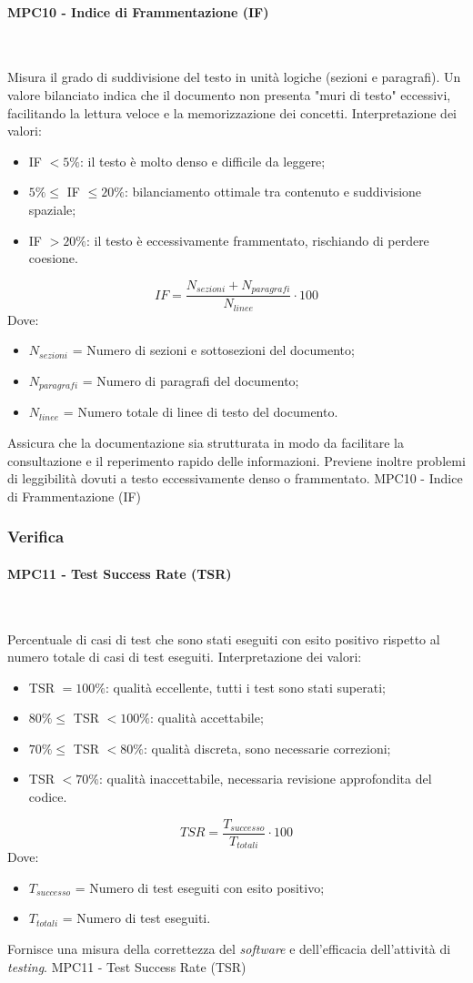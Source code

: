 \documentclass[10pt, letterpaper]{article}
\newcommand{\trisubsection}[1]{\paragraph{#1}\mbox{}\\}
\begin{document}
\trisubsection{MPC10 - Indice di Frammentazione (IF)}
{Misura il grado di suddivisione del testo in unità logiche (sezioni e paragrafi).
    Un valore bilanciato indica che il documento non presenta "muri di testo"
    eccessivi, facilitando la lettura veloce e la
    memorizzazione dei concetti.
    Interpretazione dei valori:
    \begin{itemize}
        \item IF $< 5\%$: il testo è molto denso e difficile da leggere;
        \item $5\% \le$ IF $\le 20\%$: bilanciamento ottimale tra contenuto
              e suddivisione spaziale;
        \item IF $> 20\%$: il testo è eccessivamente frammentato,
              rischiando di perdere coesione.
    \end{itemize}
}
{\[ IF = \frac{N_{sezioni} + N_{paragrafi}}{N_{linee}} \cdot 100 \]
    Dove:
    \begin{itemize}
        \item $N_{sezioni}$ = Numero di sezioni e sottosezioni del documento;
        \item $N_{paragrafi}$ = Numero di paragrafi del documento;
        \item $N_{linee}$ = Numero totale di linee di testo del documento.
    \end{itemize}
}
{Assicura che la documentazione sia strutturata in modo da facilitare la consultazione
    e il reperimento rapido delle informazioni. Previene inoltre problemi di leggibilità dovuti
    a testo eccessivamente denso o frammentato.}
{MPC10 - Indice di Frammentazione (IF)}

\subsubsection{Verifica}

\trisubsection{MPC11 - Test Success Rate (TSR)}
{Percentuale di casi di test che sono stati eseguiti con esito positivo rispetto al
    numero totale di casi di test eseguiti.
    Interpretazione dei valori:
    \begin{itemize}
        \item TSR $= 100\%$: qualità eccellente, tutti i test sono stati superati;
        \item $80\% \leq $ TSR $ < 100\%$: qualità accettabile;
        \item $70\% \leq $ TSR $ < 80\%$: qualità discreta, sono necessarie correzioni;
        \item TSR $< 70\%$: qualità inaccettabile, necessaria revisione approfondita del codice.
    \end{itemize}}
{\[ TSR = \frac{T_{successo}}{T_{totali}} \cdot 100 \]
    Dove:
    \begin{itemize}
        \item $T_{successo}$ = Numero di test eseguiti con esito positivo;
        \item $T_{totali}$ = Numero di test eseguiti.
    \end{itemize}
}
{Fornisce una misura della correttezza del \textit{software} e dell'efficacia
    dell'attività di \textit{testing}.}
{MPC11 - Test Success Rate (TSR)}
\end{document}
